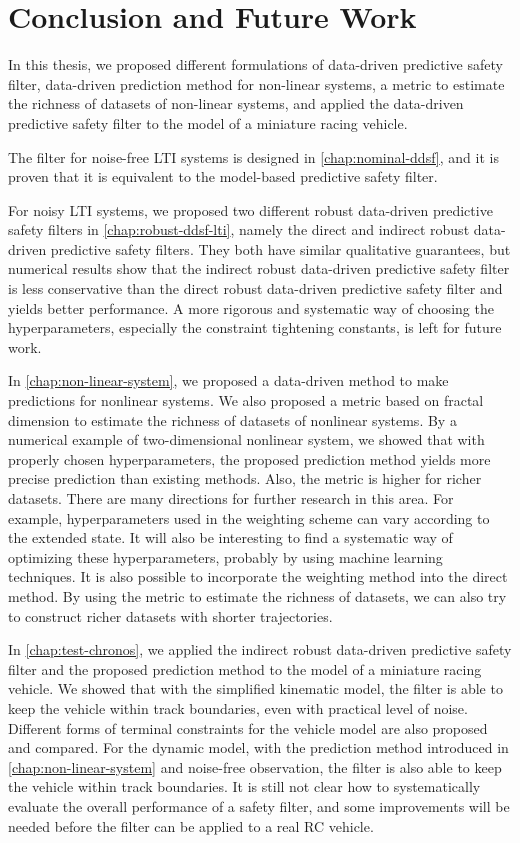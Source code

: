 \chapter{Conclusion and Future Work}\label{chap:conclusion}

In this thesis, we proposed different formulations of data-driven predictive safety filter, data-driven prediction method for non-linear systems, a metric to estimate the richness of datasets of non-linear systems, and applied the data-driven predictive safety filter to the model of a miniature racing vehicle.

The filter for noise-free LTI systems is designed in \cref{chap:nominal-ddsf}, and it is proven that it is equivalent to the model-based predictive safety filter.

For noisy LTI systems, we proposed two different robust data-driven predictive safety filters in \cref{chap:robust-ddsf-lti}, namely the direct and indirect robust data-driven predictive safety filters.
They both have similar qualitative guarantees, but numerical results show that the indirect robust data-driven predictive safety filter is less conservative than the direct robust data-driven predictive safety filter and yields better performance.
A more rigorous and systematic way of choosing the hyperparameters, especially the constraint tightening constants, is left for future work.

In \cref{chap:non-linear-system}, we proposed a data-driven method to make predictions for nonlinear systems.
We also proposed a metric based on fractal dimension to estimate the richness of datasets of nonlinear systems.
By a numerical example of two-dimensional nonlinear system, we showed that with properly chosen hyperparameters, the proposed prediction method yields more precise prediction than existing methods.
Also, the metric is higher for richer datasets.
There are many directions for further research in this area.
For example, hyperparameters used in the weighting scheme can vary according to the extended state.
It will also be interesting to find a systematic way of optimizing these hyperparameters, probably by using machine learning techniques.
It is also possible to incorporate the weighting method into the direct method.
By using the metric to estimate the richness of datasets, we can also try to construct richer datasets with shorter trajectories.

In \cref{chap:test-chronos}, we applied the indirect robust data-driven predictive safety filter and the proposed prediction method to the model of a miniature racing vehicle.
We showed that with the simplified kinematic model, the filter is able to keep the vehicle within track boundaries, even with practical level of noise.
Different forms of terminal constraints for the vehicle model are also proposed and compared.
For the dynamic model, with the prediction method introduced in \cref{chap:non-linear-system} and noise-free observation, the filter is also able to keep the vehicle within track boundaries.
It is still not clear how to systematically evaluate the overall performance of a safety filter, and some improvements will be needed before the filter can be applied to a real RC vehicle.
